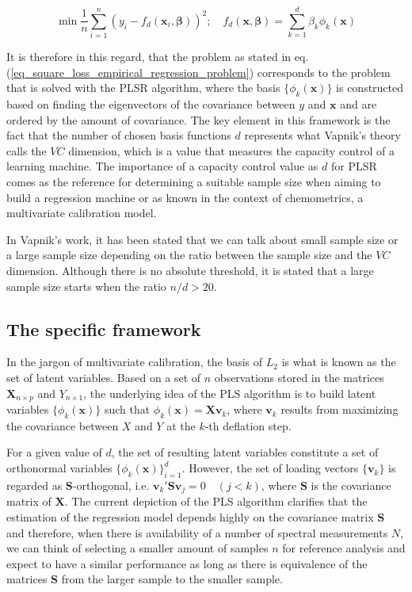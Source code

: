 \documentclass[journal=ancham,manuscript=article]{achemso}
\begin{document}
\begin{equation}
    \min \frac{1}{n} \sum_{i=1}^n (y_i-f_d(\mathbf{x}_i, \boldsymbol{\beta}))^2; \quad f_d(\mathbf{x}, \boldsymbol{\beta}) = \sum_{k=1}^{d} \beta_k \phi_{k}(\mathbf{x})
    \label{eq_square_loss_empirical_regression_problem}
\end{equation}

It is therefore in this regard, that the problem as stated in eq. (\ref{eq_square_loss_empirical_regression_problem}) corresponds to the problem that is solved with the PLSR algorithm, where the basis $\{\phi_{k}(\mathbf{x})\}$ is constructed based on finding the eigenvectors of the covariance between $y$ and $\mathbf{x}$ and are ordered by the amount of covariance. The key element in this framework is the fact that the number of chosen basis functions $d$ represents what Vapnik's theory calls the $VC$ dimension, which is a value that measures the capacity control of a learning machine. The importance of a capacity control value as $d$ for PLSR comes as the reference for determining a suitable sample size when aiming to build a regression machine or as known in the context of chemometrics, a multivariate calibration model. 

In Vapnik's work, it has been stated that we can talk about small sample size or a large sample size depending on the ratio between the sample size and the $VC$ dimension. Although there is no absolute threshold, it is stated that a large sample size starts when the ratio $n/d>20$.


\subsection*{The specific framework}

In the jargon of multivariate calibration, the basis of $L_2$ is what is known as the set of latent variables. Based on a set of $n$ observations stored in the matrices $\mathbf{X}_{n\times p}$ and $Y_{n\times 1}$, the underlying idea of the PLS algorithm is to build latent variables $\{\phi_{k}(\mathbf{x})\}$ such that $\phi_k(\mathbf{x}) = \mathbf{Xv}_{k}$, where $\mathbf{v}_k$ results from maximizing the covariance between $X$ and $Y$ at the $k$-th deflation step. 

For a given value of $d$, the set of resulting latent variables constitute a set of orthonormal variables $\{\phi_{k}(\mathbf{x})\}_{i=1}^d$. However, the set of loading vectors $\{\mathbf{v}_k\}$ is regarded as $\mathbf{S}$-orthogonal, i.e. $\mathbf{v}_k'\mathbf{S}\mathbf{v}_j = 0 \quad (j<k)$, where $\mathbf{S}$ is the covariance matrix of $\mathbf{X}$. The current depiction of the PLS algorithm clarifies that the estimation of the regression model depends highly on the covariance matrix $\mathbf{S}$ and therefore, when there is availability of a number of spectral measurements $N$, we can think of selecting a smaller amount of samples $n$ for reference analysis and expect to have a similar performance as long as there is equivalence of the matrices $\mathbf{S}$ from the larger sample to the smaller sample. 
\end{document}
